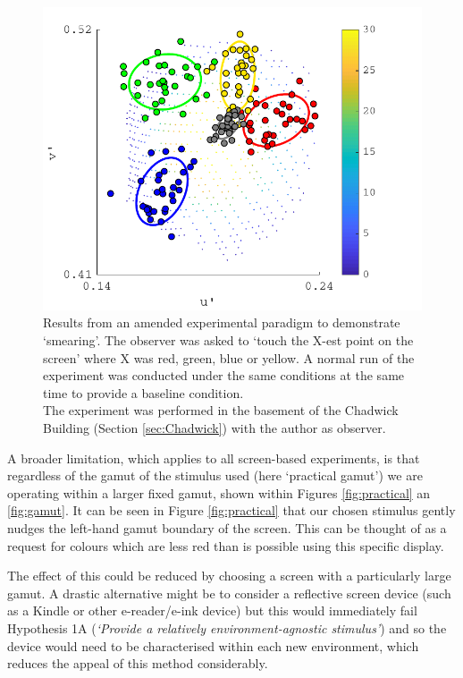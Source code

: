\begin{figure}[hbtp]
\includegraphics[max width=\textwidth]{figs/tablet/basement_rgby_test.pdf}
\caption{Results from an amended experimental paradigm to demonstrate `smearing'. The observer was asked to `touch the X-est point on the screen' where X was red, green, blue or yellow. A normal run of the experiment was conducted under the same conditions at the same time to provide a baseline condition.\\ 
The experiment was performed in the basement of the Chadwick Building (Section \ref{sec:Chadwick}) with the author as observer.}
\label{fig:basement_rgby_test}
\end{figure}

A broader limitation, which applies to all screen-based experiments, is that regardless of the gamut of the stimulus used (here `practical gamut') we are operating within a larger fixed gamut, shown within Figures \ref{fig:practical} an \ref{fig:gamut}. It can be seen in Figure \ref{fig:practical} that our chosen stimulus gently nudges the left-hand gamut boundary of the screen. This can be thought of as a request for colours which are less red than is possible using this specific display.

The effect of this could be reduced by choosing a screen with a particularly large gamut. A drastic alternative might be to consider a reflective screen device (such as a Kindle or other e-reader/e-ink device) but this would immediately fail Hypothesis 1A (\emph{`Provide a relatively environment-agnostic stimulus'}) and so the device would need to be characterised within each new environment, which reduces the appeal of this method considerably.

